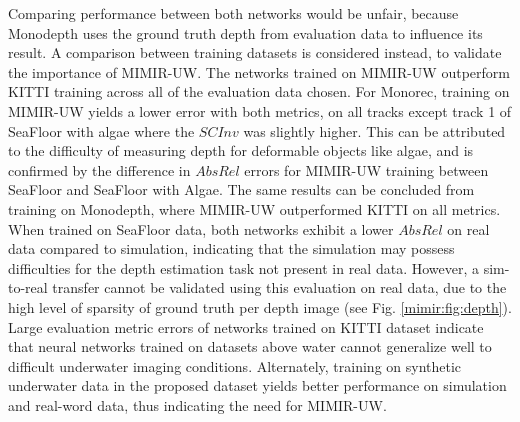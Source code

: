 Comparing performance between both networks would be unfair, because Monodepth uses the ground truth depth from evaluation data to influence its result. A comparison between training datasets is considered instead, to validate the importance of MIMIR-UW. The networks trained on MIMIR-UW outperform KITTI training across all of the evaluation data chosen. For Monorec, training on MIMIR-UW yields a lower error with both metrics, on all tracks except track 1 of SeaFloor with algae where the $SCInv$ was slightly higher. This can be attributed to the difficulty of measuring depth for deformable objects like algae, and is confirmed by the difference in $Abs Rel$ errors for MIMIR-UW training between SeaFloor and SeaFloor with Algae. The same results can be concluded from training on Monodepth, where MIMIR-UW outperformed KITTI on all metrics. When trained on SeaFloor data, both networks exhibit a lower $Abs Rel$ on real data compared to simulation, indicating that the simulation may possess difficulties for the depth estimation task not present in real data. However, a sim-to-real transfer cannot be validated using this evaluation on real data, due to the high level of sparsity of ground truth per depth image (see Fig. \ref{mimir:fig:depth}). Large evaluation metric errors of networks trained on KITTI dataset indicate that neural networks trained on datasets above water cannot generalize well to difficult underwater imaging conditions. Alternately, training on synthetic underwater data in the proposed dataset yields better performance on simulation and real-word data, thus indicating the need for MIMIR-UW.




